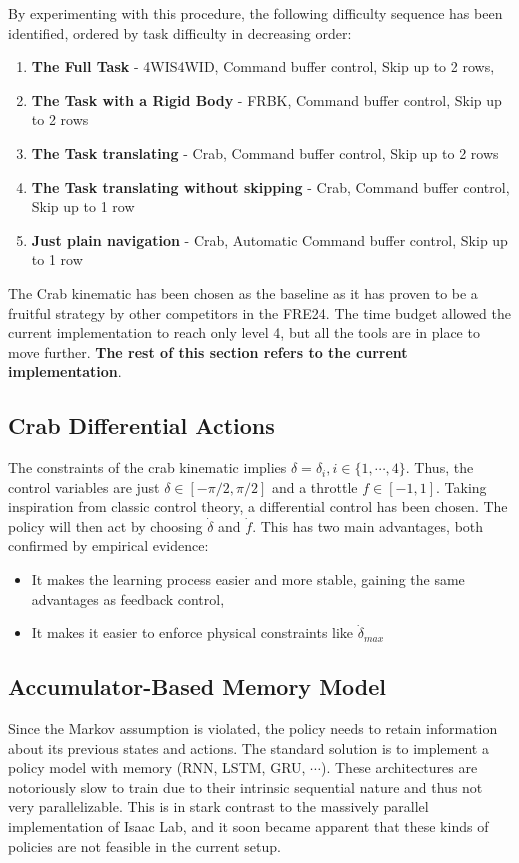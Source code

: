\documentclass[11pt,a4paper,twocolumn]{article}
\begin{document}
By experimenting with this procedure, the following difficulty sequence has been identified, ordered by task difficulty in decreasing order:
\begin{enumerate}
    \item \textbf{The Full Task} - 4WIS4WID, Command buffer control, Skip up to 2 rows,
    \item \textbf{The Task with a Rigid Body} - FRBK, Command buffer control, Skip up to 2 rows
    \item \textbf{The Task translating} - Crab, Command buffer control, Skip up to 2 rows
    \item \textbf{The Task translating without skipping} - Crab, Command buffer control, Skip up to 1 row
    \item \textbf{Just plain navigation} - Crab, Automatic Command buffer control, Skip up to 1 row
\end{enumerate}
The Crab kinematic has been chosen as the baseline as it has proven to be a fruitful strategy by other competitors in the FRE24. The time budget allowed the current implementation to reach only level 4, but all the tools are in place to move further. \textbf{The rest of this section refers to the current implementation}.

\subsection{Crab Differential Actions}
The constraints of the crab kinematic implies $\delta = \delta_i, i\in\{1, \cdots, 4\}$. Thus, the control variables are just $\delta \in [-\pi/2, \pi/2]$ and a throttle $f \in [-1,1]$. Taking inspiration from classic control theory, a differential control has been chosen. The policy will then act by choosing $\dot{\delta}$ and $\dot{f}$. This has two main advantages, both confirmed by empirical evidence:
\begin{itemize}
    \item It makes the learning process easier and more stable, gaining the same advantages as feedback control,
    \item It makes it easier to enforce physical constraints like $\dot{\delta}_{max}$ 
\end{itemize}

\subsection{Accumulator-Based Memory Model}
Since the Markov assumption is violated, the policy needs to retain information about its previous states and actions. The standard solution is to implement a policy model with memory (RNN, LSTM, GRU, $\cdots$). These architectures are notoriously slow to train due to their intrinsic sequential nature and thus not very parallelizable. This is in stark contrast to the massively parallel implementation of Isaac Lab, and it soon became apparent that these kinds of policies are not feasible in the current setup.
\end{document}
